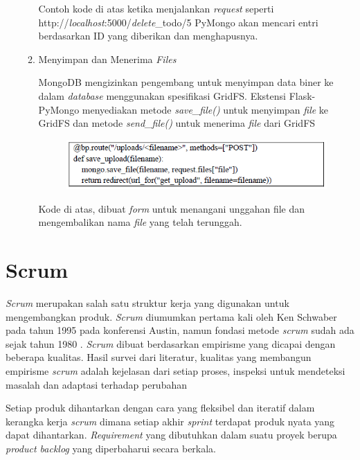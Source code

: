 \begin{enumerate}
\begin{enumerate}
	Contoh kode di atas ketika menjalankan \emph{request} seperti http://\emph{localhost}:5000/\emph{delete}\_todo/5 PyMongo akan mencari entri berdasarkan ID yang diberikan dan menghapusnya.
	
	\item Menyimpan dan Menerima \emph{Files}
	
	MongoDB mengizinkan pengembang untuk menyimpan data biner ke dalam \emph{database} menggunakan spesifikasi GridFS. Ekstensi Flask-PyMongo menyediakan metode \emph{save\_file()} untuk menyimpan \emph{file} ke GridFS dan metode \emph{send\_file()} untuk menerima \emph{file} dari GridFS
	
	\begin{figure}[H]
		\centering
		\includegraphics[width=12cm]{gambar/mongoDB6.png}
	\end{figure}
	
	Kode di atas, dibuat \emph{form} untuk menangani unggahan file dan mengembalikan nama \emph{file} yang telah terunggah.
		
	\end{enumerate}
	
\end{enumerate}

\section{Scrum}

\emph{Scrum} merupakan salah satu struktur kerja yang digunakan untuk mengembangkan produk. \emph{Scrum} diumumkan pertama kali oleh Ken Schwaber pada tahun 1995 pada konferensi Austin, namun fondasi metode \emph{scrum} sudah ada sejak tahun 1980 \citep{Oziera2016The}. \emph{Scrum} dibuat berdasarkan empirisme yang dicapai dengan beberapa kualitas. Hasil survei dari literatur, kualitas yang membangun empirisme \emph{scrum} adalah kejelasan dari setiap proses, inspeksi untuk mendeteksi masalah dan adaptasi terhadap perubahan

Setiap produk dihantarkan dengan cara yang fleksibel dan iteratif dalam kerangka kerja \emph{scrum} dimana setiap akhir \emph{sprint} terdapat produk nyata yang dapat dihantarkan. \emph{Requirement} yang dibutuhkan dalam suatu proyek berupa \emph{product backlog} yang diperbaharui secara berkala.

